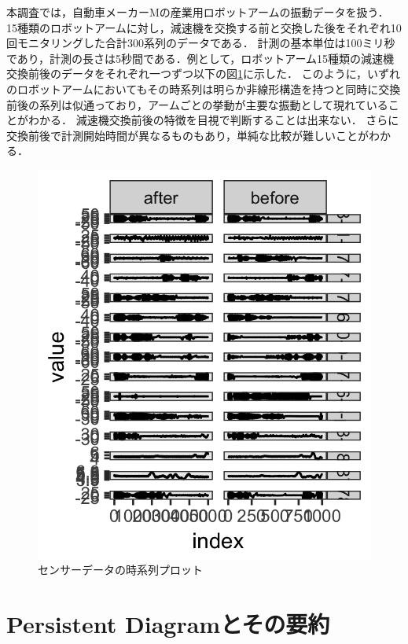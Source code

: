 \documentclass{jarticle}
\begin{document}
本調査では，自動車メーカーMの産業用ロボットアームの振動データを扱う．
15種類のロボットアームに対し，減速機を交換する前と交換した後をそれぞれ10回モニタリングした合計300系列のデータである．
計測の基本単位は100ミリ秒であり，計測の長さは5秒間である．例として，ロボットアーム15種類の減速機交換前後のデータをそれぞれ一つずつ以下の図\ref{fig:ts}に示した．
このように，いずれのロボットアームにおいてもその時系列は明らか非線形構造を持つと同時に交換前後の系列は似通っており，アームごとの挙動が主要な振動として現れていることがわかる．
減速機交換前後の特徴を目視で判断することは出来ない．
さらに交換前後で計測開始時間が異なるものもあり，単純な比較が難しいことがわかる．
\begin{figure}[H]
\begin{center}
	\includegraphics[width=12cm]{fig/ts.png}	
	\caption{センサーデータの時系列プロット}\label{fig:ts}
\end{center}
\end{figure}


\section{Persistent Diagramとその要約}
\end{document}
